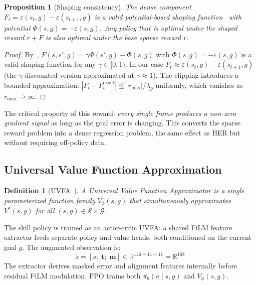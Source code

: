 \documentclass[11pt,a4paper]{article}
\newtheorem{definition}{Definition}
\newtheorem{proposition}{Proposition}
\begin{document}
\begin{proposition}[Shaping consistency]
\label{prop:shaping}
The dense component $F_t = \varepsilon(s_t, g) - \varepsilon(s_{t+1}, g)$ is a valid potential-based shaping function~\cite{ng1999policy} with potential $\Phi(s, g) = -\varepsilon(s, g)$.
Any policy that is optimal under the shaped reward $r + F$ is also optimal under the base sparse reward $r$.
\end{proposition}

\begin{proof}
By~\cite{ng1999policy}, $F(s, s', g) = \gamma \Phi(s', g) - \Phi(s, g)$ with $\Phi(s, g) = -\varepsilon(s, g)$ is a valid shaping function for any $\gamma \in [0, 1)$.
In our case $F_t \approx \varepsilon(s_t, g) - \varepsilon(s_{t+1}, g)$ (the $\gamma$-discounted version approximated at $\gamma \approx 1$).
The clipping introduces a bounded approximation: $|F_t - F_t^{\text{exact}}| \leq |r_{\max}|/\lambda_p$ uniformly, which vanishes as $r_{\max} \to \infty$.
\end{proof}

The critical property of this reward: \emph{every single frame produces a non-zero gradient signal} as long as the goal error is changing.
This converts the sparse reward problem into a dense regression problem, the same effect as HER but without requiring off-policy data.

\subsection{Universal Value Function Approximation}
\label{sec:uvfa}

\begin{definition}[UVFA~\cite{schaul2015universal}]
A Universal Value Function Approximator is a single parameterized function family $V_\phi(s, g)$ that simultaneously approximates $V^*(s, g)$ for all $(s, g) \in \mathcal{S} \times \mathcal{G}$.
\end{definition}

The skill policy is trained as an actor-critic UVFA: a shared FiLM feature extractor feeds separate policy and value heads, both conditioned on the current goal $g$.
The augmented observation is:
\begin{equation}
\tilde{s} = [s;\; \mathbf{t};\; \mathbf{m}] \in \mathbb{R}^{146+11+11}=\mathbb{R}^{168}
\label{eq:augmented-obs}
\end{equation}
The extractor derives masked error and alignment features internally before residual FiLM
modulation. PPO trains both $\pi_\theta(a\mid s,g)$ and $V_\phi(s,g)$.
\end{document}
